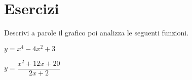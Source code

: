 
\section{Esercizi}

% 

\begin{esercizio}\label{ese:03.1}
Descrivi a parole il grafico poi analizza le seguenti funzioni.

\begin{multicols}{2}
 \begin{enumeratea}
  \item 
\(y=x^4-4x^2+3\)
 \begin{center}
 \scalebox{.8}{\funzioneb}
 \end{center}
  \item 
\(y=\dfrac{x^2+12x+20}{2x+2}\)
 \begin{center}
 \scalebox{.5}{\funzionec}
 \end{center}
 \end{enumeratea}
\end{multicols}
\end{esercizio}

% 
% 
% 
%  

